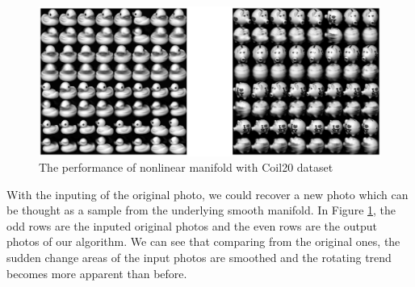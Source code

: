 \documentclass{article}
\theoremstyle{remark}
\begin{document}
\begin{figure}[h] %
   \centering
   \includegraphics[width=\linewidth]{real.eps} 
   \caption{The performance of nonlinear manifold with Coil20 dataset}
   \label{fig:example Coil20}
\end{figure}

With the inputing of the original photo, we could recover a new photo which can be thought as a sample from the underlying smooth manifold. In Figure \ref{fig:example Coil20}, the odd rows are the inputed original photos and the even rows are the output photos of our algorithm. We can see that comparing from the original ones, the sudden change areas of the input photos are smoothed and the rotating trend becomes more apparent than before.


\nocite{langley00}





%
%
%
\end{document}
